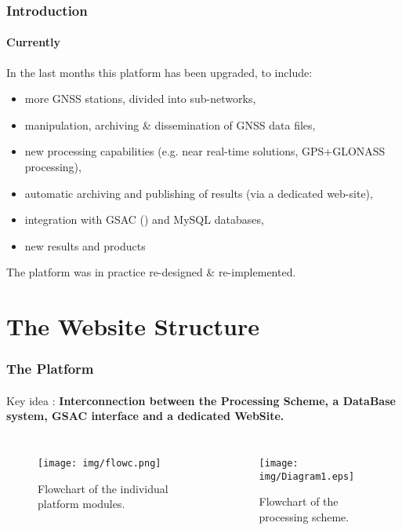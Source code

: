 \documentclass{beamer}
\begin{document}
\begin{frame}\frametitle{Introduction}\framesubtitle{Currently}

    In the last months this platform has been upgraded, to include:

    \begin{itemize}
        \item more GNSS stations, divided into sub-networks,
        \item manipulation, archiving \& dissemination of GNSS data files,
        \item new processing capabilities (e.g. near real-time solutions, GPS+GLONASS processing),
        \item automatic archiving and publishing of results (via a dedicated web-site),
        \item integration with GSAC (\cite{gsac}) and MySQL databases,
        \item new results and products
    \end{itemize}

The platform was in practice re-designed \& re-implemented.

\end{frame}

\section{The Website Structure}

\begin{frame}\frametitle{The Platform}\framesubtitle{}

    Key idea : \textbf{Interconnection between the Processing Scheme, a DataBase system, GSAC interface and a dedicated WebSite.}

  \begin{columns}
    \begin{figure}
        \begin{center}
        \texttt{[image: img/flowc.png]}
        \caption{Flowchart of the individual platform modules.}
        \label{fig:mits}
        \end{center}
    \end{figure}
    \begin{figure}
        \begin{center}
        \texttt{[image: img/Diagram1.eps]}
        \caption{Flowchart of the processing scheme.}
        \label{fig:dgrm}
        \end{center}
    \end{figure}
  \end{columns}

\end{frame}
\end{document}
